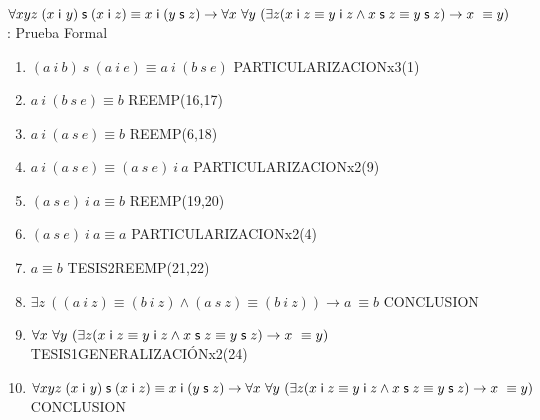 \documentclass[10pt]{beamer}
\newcounter{saveenumi}
\newcommand{\seti}{\setcounter{saveenumi}{\value{enumi}}}
\newcommand{\conti}{\setcounter{enumi}{\value{saveenumi}}}
\newcommand{\Cfontd}{\fontsize{5.5}{9.5}\selectfont}
\newcommand{\Cfonti}{\fontsize{8.5}{7.2}\selectfont}
\newcommand{\Nand}{\wedge}
\newcommand{\Nrefl}{{A}_{\leq R}}
\newcommand{\Nanti}{{A}_{\leq A}}
\newcommand{\Ntrans}{{A}_{\leq T}}
\newcommand{\NsCot}{{A}_{\mathsf{s}esC}}
\newcommand{\NsLesCot}{{A}_{\mathsf{s}\leq C}}
\newcommand{\idistr}{\forall xyz\;(x\;\mathsf{i}\
y)\;\mathsf{s}\;(x\;\mathsf{i}\;z)\equiv x\;\mathsf{i}\;(y\;\mathsf{s}%
\;z)}
\newcommand{\myconj}{x\;\mathsf{i}\;z\equiv y\;\mathsf{%
i}\;z\wedge x\;\mathsf{s}\;z\equiv y\;\mathsf{s}\;z}
\begin{document}
\begin{frame}{\Cfonti$\idistr \rightarrow \forall x\ \forall y\ (\exists z (\myconj) \rightarrow x\ \equiv y)$:
    Prueba Formal}

\Cfontd
\begin{enumerate}[<+->]
  \conti
  \item $ (a\ i\ b)\ s\ (a\ i\ e) \equiv a\ i\ (b\ s\ e)$ \hfill PARTICULARIZACIONx3(1)
  \item $ a\ i\ (b\ s\ e) \equiv b $ \hfill REEMP(16,17)
  \item $ a\ i\ (a\ s\ e) \equiv b $ \hfill REEMP(6,18)
  \item $a\ i\ (a\ s\ e) \equiv (a\ s\ e)\ i\ a $ \hfill PARTICULARIZACIONx2(9)

  \item $ (a\ s\ e)\ i\ a \equiv b$ \hfill REEMP(19,20)
  \item $ (a\ s\ e)\ i\ a \equiv a$ \hfill PARTICULARIZACIONx2(4)
  \item $ a \equiv b$ \hfill TESIS2REEMP(21,22)
  \item $ \exists z\ ((a\ i\ z) \equiv (b\ i\ z) \Nand (a\ s\ z) \equiv (b\ i\ z)) \rightarrow a\ \equiv b$ \hfill CONCLUSION
  \item $ \forall x\ \forall y\ (\exists z (\myconj) \rightarrow x\ \equiv y)$ \hfill TESIS1GENERALIZACIÓNx2(24)
  \item $ \idistr \rightarrow \forall x\ \forall y\ (\exists z (\myconj) \rightarrow x\ \equiv y)$ \hfill CONCLUSION
  \seti
\end{enumerate}

\end{frame}



%
\end{document}
